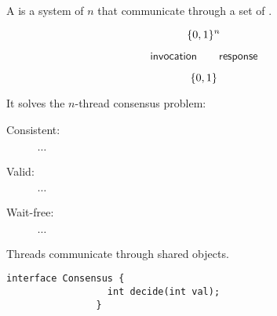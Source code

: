 
\begin{frame}{}
  \centerline{}

  \vspace{0.50cm}
\end{frame}

\begin{frame}{}
  \begin{definition}
    A  is a system of $n$ 
    that communicate through a set of .

    \begin{description}[Communicate]
      \item[Propose]
	\[
	  \{0,1\}^{n}
	\]
      \item[Communicate] 
	\[
	  \textsf{invocation} \qquad \textsf{response}
	\]
      \item[Decide] 
	\[
	  \{0,1\}
	\]
    \end{description}

    \pause
    \vspace{0.30cm}
    It  solves the $n$-thread consensus problem:
    \begin{description}
      \item[Consistent:] $\cdots$
      \item[Valid:] $\cdots$
      \item[Wait-free:] $\cdots$
    \end{description}
  \end{definition}
\end{frame}

\begin{frame}{}

  \centerline{\Large Threads communicate through shared objects.}
\end{frame}

\begin{frame}[fragile]{}

  \begin{lstlisting}[style = CStyle]
                interface Consensus {
                  int decide(int val);
                }
  \end{lstlisting}
\end{frame}

